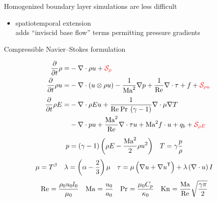 \documentclass[mathserif]{beamer}
\begin{document}
\begin{frame}{Homogenized boundary layer simulations are less difficult}
\begin{itemize}
  \item<3-> \citet{Topalian2014Spatiotemporal} spatiotemporal extension\\
        adds ``inviscid base flow'' terms permitting pressure gradients
\end{itemize}
\end{frame}


\begin{frame}{Compressible Navier--Stokes formulation}
\begin{footnotesize}
\label{eq:nondim_model}
\begin{align}
  \label{eq:nondim_continuity}
  \frac{\partial}{\partial{}t}\rho{}
 =
 &- \nabla\cdot\rho{}u
  + {\color{red}\mathcal{S}_\rho}
  \\
  \label{eq:nondim_momentum}
  \frac{\partial}{\partial{}t}\rho{}u
 =
 &- \nabla\cdot(u\otimes\rho{}u)
  - \frac{1}{\mbox{Ma}_{}^{2}} \nabla{} p
  + \frac{1}{\mbox{Re}_{}} \nabla\cdot\tau
  + f
  + {\color{red}\mathcal{S}_{\rho{}u}}
  \\
  \label{eq:nondim_energy}
  \frac{\partial}{\partial{}t} \rho{}E
 =
 &- \nabla\cdot\rho{}Eu
  + \frac{1}{\mbox{Re}_{}\,\mbox{Pr}_{}\,\left( \gamma - 1 \right)}
    \nabla\cdot\mu\nabla{} T
\\
 &- \nabla\cdot{} p u
  + \frac{\mbox{Ma}_{}^{2}}{\mbox{Re}_{}} \nabla\cdot\tau{} u
  + \mbox{Ma}_{}^{2} f \cdot{} u
  + q_{b}
  + {\color{red}\mathcal{S}_{\rho{}E}}
\end{align}
\vfill
\begin{align}
  p &= \left(\gamma-1\right) \left(
    \rho{}E - \frac{\mbox{Ma}_{}^{2}}{2}\rho{}u^{2}
  \right)
  &
  T &= \gamma{} \frac{p}{\rho}
\end{align}
\begin{align}
  \mu &= T^{\beta}
  &
  \lambda &= \left(\alpha-\frac{2}{3}\right)\mu
  &
  \tau &=  \mu\left(\nabla{}u+{\nabla{}u}^{\mathsf{T}}\right)
         + \lambda\left(\nabla\cdot{}u\right) I
\end{align}
\begin{align}
  \mbox{Re}_{} &= \frac{\rho_0 u_0 l_0}{\mu_0}
&
  \mbox{Ma}_{} &= \frac{u_0}{a_0}
&
  \mbox{Pr}_{} &= \frac{\mu_0 C_p}{\kappa_0}
&
  \mbox{Kn}_{} &= \frac{\mbox{Ma}_{}}{\mbox{Re}_{}}\sqrt{\frac{\gamma\pi}{2}}
\end{align}
\end{footnotesize}
\end{frame}
\end{document}
